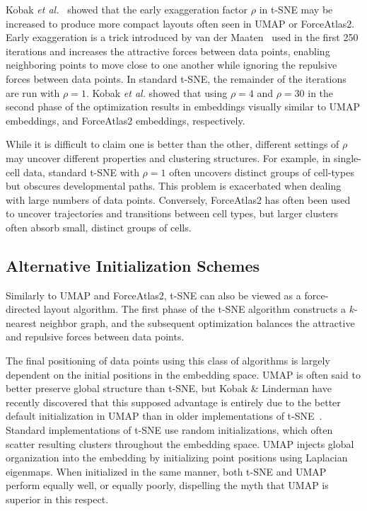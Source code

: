 \documentclass[twocolumn]{bmcart}
\begin{document}
Kobak \textit{et al.}~\cite{todo} showed that the early exaggeration factor $\rho$ in t-SNE may be increased to produce more compact layouts often seen in UMAP or ForceAtlas2. Early exaggeration is a trick introduced by van der Maaten~\cite{maaten2008visualizing} used in the first 250 iterations and increases the attractive forces between data points, enabling neighboring points to move close to one another while ignoring the repulsive forces between data points. In standard t-SNE, the remainder of the iterations are run with $\rho=1$. Kobak \textit{et al.} showed that using $\rho=4$ and $\rho=30$ in the second phase of the optimization results in embeddings visually similar to UMAP embeddings, and ForceAtlas2 embeddings, respectively.

While it is difficult to claim one is better than the other, different settings of $\rho$ may uncover different properties and clustering structures. For example, in single-cell data, standard t-SNE with $\rho=1$ often uncovers distinct groups of cell-types but obscures developmental paths. This problem is exacerbated when dealing with large numbers of data points. Conversely, ForceAtlas2 has often been used to uncover trajectories and transitions between cell types, but larger clusters often absorb small, distinct groups of cells.

\subsection*{Alternative Initialization Schemes}

Similarly to UMAP and ForceAtlas2, t-SNE can also be viewed as a force-directed layout algorithm. The first phase of the t-SNE algorithm constructs a $k$-nearest neighbor graph, and the subsequent optimization balances the attractive and repulsive forces between data points.

The final positioning of data points using this class of algorithms is largely dependent on the initial positions in the embedding space. UMAP is often said to better preserve global structure than t-SNE, but Kobak \& Linderman have recently discovered that this supposed advantage is entirely due to the better default initialization in UMAP than in older implementations of t-SNE~\cite{kobak2019umap}. Standard implementations of t-SNE use random initializations, which often scatter resulting clusters throughout the embedding space. UMAP injects global organization into the embedding by initializing point positions using Laplacian eigenmaps. When initialized in the same manner, both t-SNE and UMAP perform equally well, or equally poorly, dispelling the myth that UMAP is superior in this respect.
\end{document}
